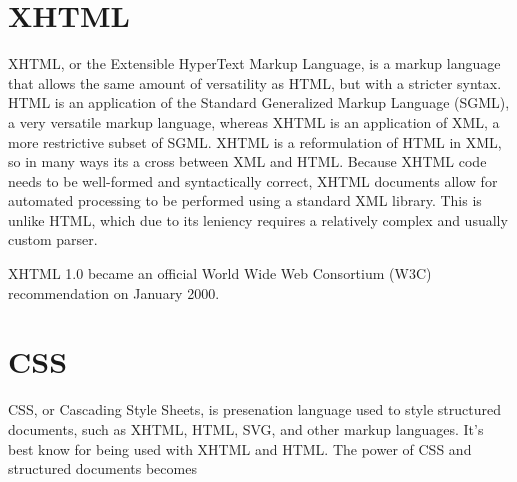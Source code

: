 \documentclass[a4paper,12pt]{report}
\begin{document}
\section{XHTML}
XHTML, or the Extensible HyperText Markup Language, is a markup language that allows the same amount of versatility as HTML, but with a stricter syntax. 
HTML is an application of the Standard Generalized Markup Language (SGML), a very versatile markup language, whereas XHTML is an application of XML, a more restrictive subset of SGML. 
XHTML is a reformulation of HTML in XML, so in many ways its a cross between XML and HTML. 
Because XHTML code needs to be well-formed and syntactically correct, XHTML documents allow for automated processing to be performed using a standard XML library. 
This is unlike HTML, which due to its leniency requires a relatively complex and usually custom parser. 


XHTML 1.0 became an official World Wide Web Consortium (W3C) recommendation on January 2000. 


\section {CSS}
CSS, or Cascading Style Sheets, is presenation language used to style structured documents, such as XHTML, HTML, SVG, and other markup languages. 
It's best know for being used with XHTML and HTML. 
The power of CSS and structured documents becomes 
\end{document}
